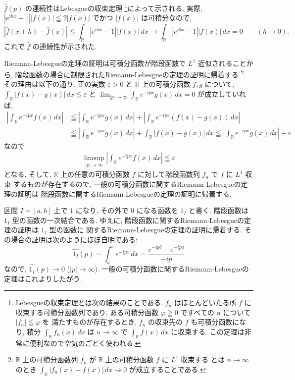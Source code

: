 \documentclass[12pt,twoside]{jarticle}
\newcommand\R{{\mathbb R}} %
\newcommand\eps{\varepsilon}
\theoremstyle{jplain}
\theoremstyle{jplain}
\theoremstyle{jplain}
\numberwithin{theorem}{section}
\numberwithin{equation}{section}
\numberwithin{figure}{section}
\numberwithin{table}{section}
\begin{document}
$\hat{f}(p)$ の連続性はLebesgueの収束定理%
\footnote{Lebesgueの収束定理とは次の結果のことである.
$f_n$ はほとんどいたる所 $f$ に収束する可積分函数列であり,
ある可積分函数 $\varphi\geqq 0$ ですべての $n$ について $|f_n|\leqq\varphi$ を
満たすものが存在するとき,
$f_n$ の収束先の $f$ も可積分函数になり,
積分 $\int_\R f_n(x)\,dx$ は $n\to\infty$ で
$\int_\R f(x)\,dx$ に収束する.
この定理は非常に便利なので空気のごとく使われる.}によって示される.
実際, $|e^{ihx}-1||f(x)|\leqq 2|f(x)|$ でかつ $|f(x)|$ は可積分なので,
\[
|\widehat{f}(x+h)-\widehat{f}(x)|
\leqq\int_\R|e^{ihx}-1||f(x)|\,dx
\longrightarrow
\int_\R|e^{i0x}-1||f(x)|\,dx = 0
\qquad(h\to 0).
\]
これで $\hat{f}$ の連続性が示された.

Riemann-Lebesgueの定理の証明は可積分函数が階段函数で $L^1$ 近似されることから,
階段函数の場合に制限されたRiemann-Lebesgueの定理の証明に帰着する%
\footnote{$\R$ 上の可積分函数列 $f_n$ が $\R$ 上の可積分函数 $f$ に $L^1$ 収束する
とは $n\to\infty$ のとき $\int_\R |f_n(x)-f(x)|\,dx\to 0$ が成立することである.}.
その理由は以下の通り.
正の実数 $\eps>0$ と $\R$ 上の可積分函数 $f,g$ について,
$\int_\R|f(x)-g(x)|\,dx\leqq\eps$ と $\lim_{|p|\to\infty}\int_\R e^{-ipx}g(x)\,dx=0$
が成立していれば,
\begin{align*}
\left|\int_\R e^{-ipx}f(x)\,dx\right|
&\leqq
\left|\int_\R e^{-ipx}g(x)\,dx\right|
+ \left|\int_\R e^{-ipx}(f(x)-g(x))\,dx\right|
\\ &
\leqq
\left|\int_\R e^{-ipx}g(x)\,dx\right| + \int_\R|f(x)-g(x)|\,dx
\leqq
\left|\int_\R e^{-ipx}g(x)\,dx\right| + \eps
\end{align*}
なので
\begin{align*}
\limsup_{|p|\to\infty}\left|\int_\R e^{-ipx}f(x)\,dx\right| \leqq \eps
\end{align*}
となる.
そして, $\R$ 上の任意の可積分函数 $f$ に対して階段函数列 $f_n$ で $f$ に $L^1$ 収束
するものが存在するので, 一般の可積分函数に関するRiemann-Lebesgueの定理の証明は
階段函数に関するRiemann-Lebesgueの定理の証明に帰着する.

区間 $I=[a,b]$ 上で $1$ になり,
その外で $0$ になる函数を $1_I$ と書く.
階段函数は $1_I$ 型の函数の一次結合である.
ゆえに, 階段函数に関するRiemann-Lebesgueの定理の証明は $1_I$ 型の函数に
関するRiemann-Lebesgueの定理の証明に帰着する.
その場合の証明は次のようにほぼ自明である:
\[
\widehat{1_I}(p)
= \int_a^b e^{-ipx}\,dx
= \frac{e^{-ipb}-e^{-ipa}}{-ip}
\]
なので, $\widehat{1_I}(p)\to 0$ ($|p|\to\infty$).
一般の可積分函数に関するRiemann-Lebesgueの定理はこれよりしたがう.
\end{document}
